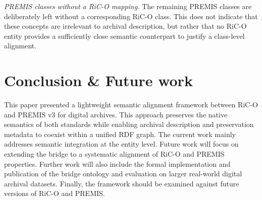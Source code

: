 \documentclass[runningheads]{llncs}
\begin{document}
\emph{PREMIS classes without a RiC-O mapping.}
The remaining PREMIS classes are deliberately left without a corresponding
RiC-O class. This does not indicate that these concepts are irrelevant to
archival description, but rather that no RiC-O entity provides a sufficiently
close semantic counterpart to justify a class-level alignment. 


\section{Conclusion \& Future work}
\label{sec:conclusion}
This paper presented a lightweight semantic alignment framework between RiC-O and PREMIS v3 for digital archives. 
This approach preserves the native semantics of both standards while enabling archival description and preservation metadata to coexist within a unified RDF graph.
%
The current work mainly addresses semantic integration at the entity level. Future work will focus on extending the bridge to a systematic alignment of RiC-O and PREMIS properties.
Further work will also include the formal implementation and publication of the bridge ontology
and evaluation on larger real-world digital archival datasets. Finally, the framework should be examined against future versions of RiC-O and PREMIS.
%
%
 
 
\end{document}
